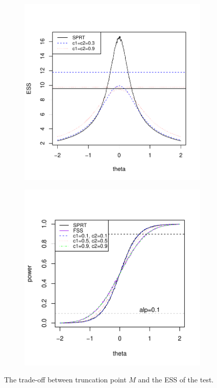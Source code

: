 \documentclass[11pt]{article}
\begin{document}
\begin{figure}
\centering
\begin{subfigure}{0.49\textwidth}
    \includegraphics[width=\textwidth]{images/trade-off.pdf}
\end{subfigure}
\hfill
\begin{subfigure}{0.49\textwidth}
    \includegraphics[width=\textwidth]{images/PowerFunction.pdf}
\end{subfigure}
\caption{The trade-off between truncation point $M$ and the ESS of the test.}
\label{fig:trade-off}
\end{figure}
\end{document}
